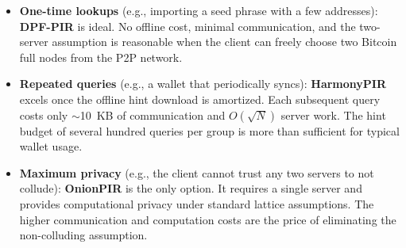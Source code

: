 \begin{itemize}[nolistsep,leftmargin=*]
    \item \textbf{One-time lookups} (e.g., importing a seed phrase with a few addresses): \textbf{DPF-PIR} is ideal. No offline cost, minimal communication, and the two-server assumption is reasonable when the client can freely choose two Bitcoin full nodes from the P2P network.

    \item \textbf{Repeated queries} (e.g., a wallet that periodically syncs): \textbf{HarmonyPIR} excels once the offline hint download is amortized. Each subsequent query costs only $\sim$10~KB of communication and $O(\sqrt{N})$ server work. The hint budget of several hundred queries per group is more than sufficient for typical wallet usage.

    \item \textbf{Maximum privacy} (e.g., the client cannot trust any two servers to not collude): \textbf{OnionPIR} is the only option. It requires a single server and provides computational privacy under standard lattice assumptions. The higher communication and computation costs are the price of eliminating the non-colluding assumption.
\end{itemize}
